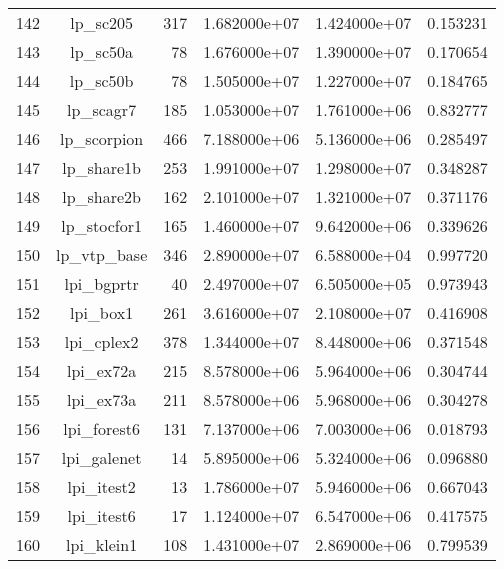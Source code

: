 \documentclass[8pt]{report}
\begin{document}
\begin{table*}
\begin{tabular}{|l|c|r|r|r|r|}
142 &                 lp\_sc205 &   317 &  1.682000e+07 &  1.424000e+07 &  0.153231 \\
143 &                 lp\_sc50a &    78 &  1.676000e+07 &  1.390000e+07 &  0.170654 \\
144 &                 lp\_sc50b &    78 &  1.505000e+07 &  1.227000e+07 &  0.184765 \\
145 &                lp\_scagr7 &   185 &  1.053000e+07 &  1.761000e+06 &  0.832777 \\
146 &              lp\_scorpion &   466 &  7.188000e+06 &  5.136000e+06 &  0.285497 \\
147 &               lp\_share1b &   253 &  1.991000e+07 &  1.298000e+07 &  0.348287 \\
148 &               lp\_share2b &   162 &  2.101000e+07 &  1.321000e+07 &  0.371176 \\
149 &              lp\_stocfor1 &   165 &  1.460000e+07 &  9.642000e+06 &  0.339626 \\
150 &              lp\_vtp\_base &   346 &  2.890000e+07 &  6.588000e+04 &  0.997720 \\
151 &               lpi\_bgprtr &    40 &  2.497000e+07 &  6.505000e+05 &  0.973943 \\
152 &                 lpi\_box1 &   261 &  3.616000e+07 &  2.108000e+07 &  0.416908 \\
153 &               lpi\_cplex2 &   378 &  1.344000e+07 &  8.448000e+06 &  0.371548 \\
154 &                lpi\_ex72a &   215 &  8.578000e+06 &  5.964000e+06 &  0.304744 \\
155 &                lpi\_ex73a &   211 &  8.578000e+06 &  5.968000e+06 &  0.304278 \\
156 &              lpi\_forest6 &   131 &  7.137000e+06 &  7.003000e+06 &  0.018793 \\
157 &              lpi\_galenet &    14 &  5.895000e+06 &  5.324000e+06 &  0.096880 \\
158 &               lpi\_itest2 &    13 &  1.786000e+07 &  5.946000e+06 &  0.667043 \\
159 &               lpi\_itest6 &    17 &  1.124000e+07 &  6.547000e+06 &  0.417575 \\
160 &               lpi\_klein1 &   108 &  1.431000e+07 &  2.869000e+06 &  0.799539 \\
\bottomrule
\end{tabular}
\end{table*}
\end{document}
